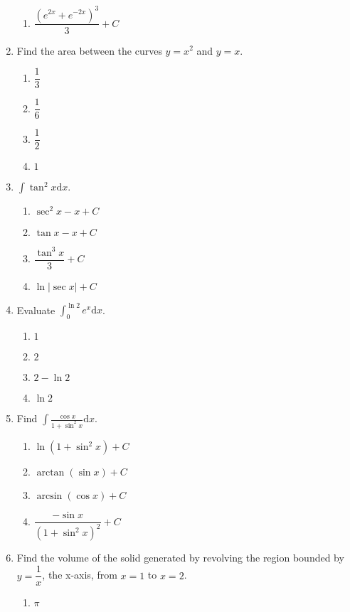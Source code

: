 \begin{multicols}{2}
\begin{enumerate}[label={\arabic*.}]
\begin{enumerate}[label={\Alph*.}]
        \item \(\dfrac{{(e^{2x} + e^{-2x})}^3}{3} + C\)
      \end{enumerate}
    \item Find the area between the curves \(y=x^2\) and \(y=x\).
      \begin{enumerate}[label={\Alph*.}]
        \item \(\dfrac{1}{3}\)
        \item \(\dfrac{1}{6}\)
        \item \(\dfrac{1}{2}\)
        \item \(1\)
      \end{enumerate}
    \item \(\displaystyle \int \tan^2 x \mathrm{d}x\).
      \begin{enumerate}[label={\Alph*.}]
        \item \(\sec^2 x - x + C\)
        \item \(\tan x - x + C\)
        \item \(\dfrac{\tan^3 x}{3} + C\)
        \item \(\ln|\sec x| + C\)
      \end{enumerate}
    \item Evaluate \(\displaystyle \int_{0}^{\ln 2} e^x \mathrm{d}x\).
      \begin{enumerate}[label={\Alph*.}]
        \item \(1\)
        \item \(2\)
        \item \(2 - \ln 2\)
        \item \(\ln 2\)
      \end{enumerate}
    \item Find \(\displaystyle \int \frac{\cos x}{1+\sin^2 x} \mathrm{d}x\).
      \begin{enumerate}[label={\Alph*.}]
        \item \(\ln(1+\sin^2 x) + C\)
        \item \(\arctan(\sin x) + C\)
        \item \(\arcsin(\cos x) + C\)
        \item \(\dfrac{-\sin x}{(1+\sin^2 x)^2} + C\)
      \end{enumerate}
    \item Find the volume of the solid generated by revolving the region bounded by \(y=\dfrac{1}{x}\), the x-axis, from \(x=1\) to \(x=2\).
      \begin{enumerate}[label={\Alph*.}]
        \item \(\pi\)

\end{enumerate}
\end{enumerate}
\end{multicols}
